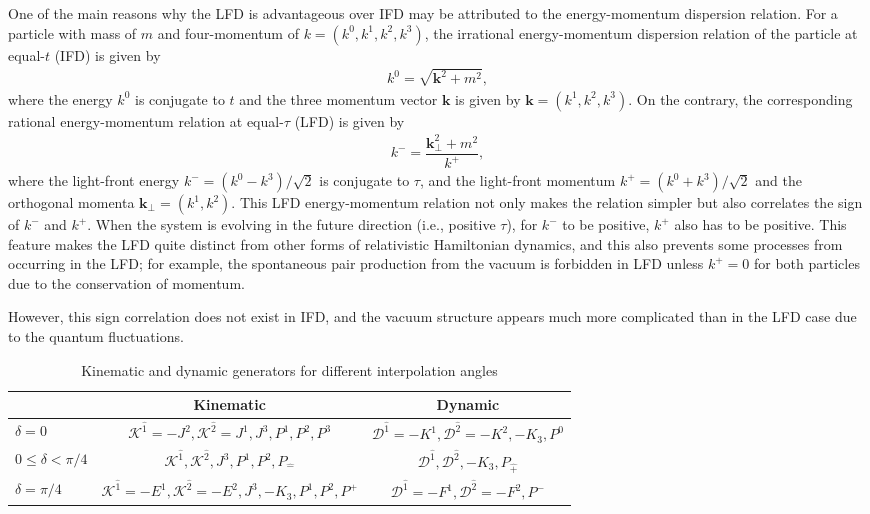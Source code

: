 \documentclass[%
 reprint,
superscriptaddress,
 amsmath,amssymb,
 aps,
]{revtex4-2}
\newcommand{\pT}{\hat{+}}
\newcommand{\mT}{\hat{-}}
\begin{document}
One of the main reasons why the LFD is advantageous over IFD may be attributed to the energy-momentum dispersion relation. For a particle with mass of $m$ and four-momentum of $k=(k^{0},k^{1},k^{2},k^{3})$, the irrational energy-momentum dispersion relation of the particle at equal-$t$ (IFD) is given by
\begin{align}
  k^{0}=\sqrt{\mathbf{k}^{2}+m^{2}}, \label{eqn:E-P_relation_IF}
\end{align}
where the energy $k^{0}$ is conjugate to $t$ and the three momentum vector $\mathbf{k}$ is given by $\mathbf{k}=(k^{1},k^{2},k^{3})$.
On the contrary, the corresponding rational energy-momentum relation at equal-$\tau$ (LFD) is given by
\begin{align}
  k^{-}=\dfrac{\mathbf{k}_{\perp}^{2}+m^{2}}{k^{+}}, \label{eqn:E-P_relation_LF}
\end{align}
where the light-front energy $k^{-}=(k^{0}-k^{3})/\sqrt{2}$ is conjugate to $\tau$, and the light-front momentum $k^{+}=(k^{0}+k^{3})/\sqrt{2}$ and the orthogonal momenta $\mathbf{k}_{\perp}=(k^{1},k^{2})$. This LFD energy-momentum relation not only makes the relation simpler but also correlates the sign of $k^{-}$ and $k^{+}$.
When the system is evolving in the future direction (i.e., positive $\tau$), for $k^{-}$ to be positive, $k^{+}$ also has to be positive. This feature makes the LFD quite distinct from other forms of relativistic Hamiltonian dynamics, and this also prevents some processes from occurring in the LFD; for example, the spontaneous pair production from the vacuum is forbidden in LFD unless $k^{+}=0$ for both particles due to the conservation of momentum.

However, this sign correlation does not exist in IFD, and the vacuum structure appears much more complicated than in the LFD case due to the quantum fluctuations. 

\begin{table}[t]
  \caption{\label{tab:Kinematic_and_dynamic_generators_for_different_interoplation_angles}Kinematic and dynamic generators for different interpolation angles \cite{Ji2001, Ji2012}}
    \begin{ruledtabular}
      \begin{tabular}{lcc}
	& Kinematic & Dynamic \\
	\hline
	\rule{0pt}{3ex} $\delta=0$ & $\mathcal{K}^{\hat{1}}=-J^{2}, \mathcal{K}^{\hat{2}}=J^{1}, J^{3}, P^{1}, P^{2}, P^{3}$ & $\mathcal{D}^{\hat{1}}=-K^{1}, \mathcal{D}^{\hat{2}}=-K^{2}, -K_3, P^{0}$\\
	$0\leq\delta<\pi/4$ & $\mathcal{K}^{\hat{1}}, \mathcal{K}^{\hat{2}}, J^{3}, P^{1}, P^{2}, P_{\mT}$ & $\mathcal{D}^{\hat{1}}, \mathcal{D}^{\hat{2}}, -K_3, P_{\pT}$\\
	$\delta=\pi/4$ & $\mathcal{K}^{\hat{1}}=-E^{1}, \mathcal{K}^{\hat{2}}=-E^{2}, J^{3}, -K_3, P^{1}, P^{2}, P^{+}$ & $\mathcal{D}^{\hat{1}}=-F^{1}, \mathcal{D}^{\hat{2}}=-F^{2}, P^{-}$\\
      \end{tabular}
    \end{ruledtabular}
\end{table}
\end{document}
